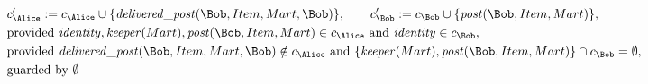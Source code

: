 \begin{align*}
&
c'_
{
\Alice
}
 := 
c_
{
\Alice
}
 \cup 
\{
\mathit{\detokenize{
delivered_post
}}
(
\Bob
,
Item
,
Mart
,
\Bob
)
\}
, \qquad 
c'_
{
\Bob
}
 := 
c_
{
\Bob
}
 \cup 
\{
\mathit{\detokenize{
post
}}
(
\Bob
,
Item
,
Mart
)
\}
,\\
&
\text{provided } 
\mathit{\detokenize{
identity
}}
,
\mathit{\detokenize{
keeper
}}
(
Mart
)
,
\mathit{\detokenize{
post
}}
(
\Bob
,
Item
,
Mart
)
 \in c_
{
\Alice
}
 \text{ and } 
\mathit{\detokenize{
identity
}}
 \in c_
{
\Bob
}
,\\
&
\text{provided } 
\mathit{\detokenize{
delivered_post
}}
(
\Bob
,
Item
,
Mart
,
\Bob
)
 \notin c_
{
\Alice
}
 \text{ and } 
\{
\mathit{\detokenize{
keeper
}}
(
Mart
)
,
\mathit{\detokenize{
post
}}
(
\Bob
,
Item
,
Mart
)
\}
 \cap c_
{
\Bob
}
 = \emptyset
,\\
&
\text{guarded by } \emptyset
\end{align*}

